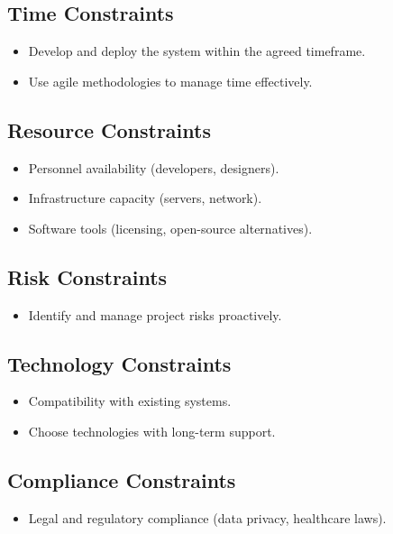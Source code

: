 \documentclass[a4paper, 12pt]{article}
\begin{document}
\subsection{Time Constraints}
\begin{itemize}
    \item Develop and deploy the system within the agreed timeframe.
    \item Use agile methodologies to manage time effectively.
\end{itemize}

\subsection{Resource Constraints}
\begin{itemize}
    \item Personnel availability (developers, designers).
    \item Infrastructure capacity (servers, network).
    \item Software tools (licensing, open-source alternatives).
\end{itemize}

\subsection{Risk Constraints}
\begin{itemize}
    \item Identify and manage project risks proactively.
\end{itemize}

\subsection{Technology Constraints}
\begin{itemize}
    \item Compatibility with existing systems.
    \item Choose technologies with long-term support.
\end{itemize}

\subsection{Compliance Constraints}
\begin{itemize}
    \item Legal and regulatory compliance (data privacy, healthcare laws).
\end{itemize}
\end{document}
